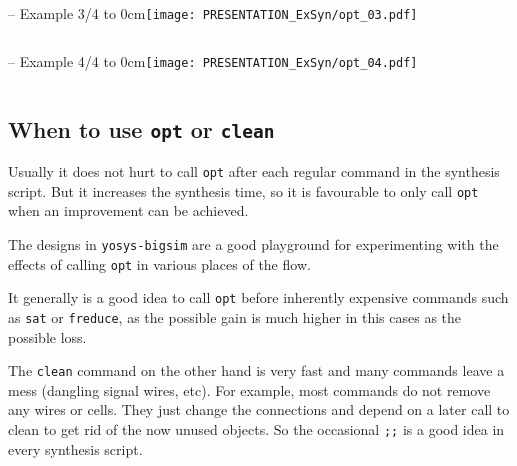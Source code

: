 \begin{frame}[t, fragile]{\subsecname{} -- Example 3/4}
\vbox to 0cm{\texttt{[image: PRESENTATION\_ExSyn/opt\_03.pdf]}\vss}
\vskip-1cm
\begin{columns}
\column[t]{5cm}

\column[t]{5cm}

\end{columns}
\end{frame}

\begin{frame}[t, fragile]{\subsecname{} -- Example 4/4}
\vbox to 0cm{\hskip6cm\texttt{[image: PRESENTATION\_ExSyn/opt\_04.pdf]}\vss}
\vskip-1cm
\begin{columns}
\column[t]{5cm}

\column[t]{5cm}

\end{columns}
\end{frame}


\subsection{When to use {\tt opt} or {\tt clean}}

\begin{frame}{\subsecname}
Usually it does not hurt to call {\tt opt} after each regular command in the
synthesis script. But it increases the synthesis time, so it is favourable
to only call {\tt opt} when an improvement can be achieved.

\bigskip
The designs in {\tt yosys-bigsim} are a good playground for experimenting with
the effects of calling {\tt opt} in various places of the flow.

\bigskip
It generally is a good idea to call {\tt opt} before inherently expensive
commands such as {\tt sat} or {\tt freduce}, as the possible gain is much
higher in this cases as the possible loss.

\bigskip
The {\tt clean} command on the other hand is very fast and many commands leave
a mess (dangling signal wires, etc). For example, most commands do not remove
any wires or cells. They just change the connections and depend on a later
call to clean to get rid of the now unused objects. So the occasional {\tt ;;}
is a good idea in every synthesis script.
\end{frame}

